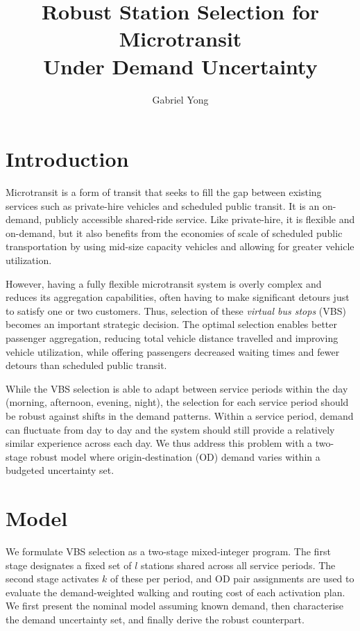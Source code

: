 \documentclass[11pt]{article}
\title{%
  Robust Station Selection for Microtransit\\
  Under Demand Uncertainty%
}
\author{Gabriel Yong}
\date{}
\theoremstyle{definition}
\begin{document}
\maketitle

\section{Introduction}

Microtransit is a form of transit that seeks to fill the gap between existing services such as private-hire vehicles and scheduled public transit. It is an on-demand, publicly accessible shared-ride service. Like private-hire, it is flexible and on-demand, but it also benefits from the economies of scale of scheduled public transportation by using mid-size capacity vehicles and allowing for greater vehicle utilization.

However, having a fully flexible microtransit system is overly complex and reduces its aggregation capabilities, often having to make significant detours just to satisfy one or two customers. Thus, selection of these \emph{virtual bus stops} (VBS) becomes an important strategic decision. The optimal selection enables better passenger aggregation, reducing total vehicle distance travelled and improving vehicle utilization, while offering passengers decreased waiting times and fewer detours than scheduled public transit.

While the VBS selection is able to adapt between service periods within the day (morning, afternoon, evening, night), the selection for each service period should be robust against shifts in the demand patterns. Within a service period, demand can fluctuate from day to day and the system should still provide a relatively similar experience across each day. We thus address this problem with a two-stage robust model where origin-destination (OD) demand varies within a budgeted uncertainty set.

\section{Model}

We formulate VBS selection as a two-stage mixed-integer program. The first stage designates a fixed set of $l$ stations shared across all service periods. The second stage activates $k$ of these per period, and OD pair assignments are used to evaluate the demand-weighted walking and routing cost of each activation plan. We first present the nominal model assuming known demand, then characterise the demand uncertainty set, and finally derive the robust counterpart.
\end{document}
